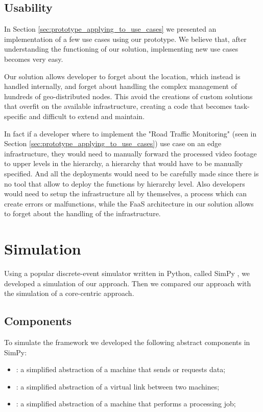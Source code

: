 \subsection{Usability}
In Section \ref{sec:prototype_applying_to_use_cases} we presented an implementation of a few use cases using our prototype. We believe that, after understanding the functioning of our solution, implementing new use cases becomes very easy.

Our solution allows developer to forget about the location, which instead is handled internally, and forget about handling the complex management of hundreds of geo-distributed nodes.
This avoid the creations of custom solutions that overfit on the available infrastructure, creating a code that becomes task-specific and difficult to extend and maintain.

In fact if a developer where to implement the "Road Traffic Monitoring" (seen in Section \ref{sec:prototype_applying_to_use_cases}) use case on an edge infrastructure, they would need to manually forward the processed video footage to upper levels in the hierarchy, a hierarchy that would have to be manually specified. And all the deployments would need to be carefully made since there is no tool that allow to deploy the functions by hierarchy level.
Also developers would need to setup the infrastructure all by themselves, a process which can create errors or malfunctions, while the FaaS architecture in our solution allows to forget about the handling of the infrastructure.


\section{Simulation}
Using a popular discrete-event simulator written in Python, called SimPy \cite{simpy}, we developed a simulation of our approach. Then we compared our approach with the simulation of a core-centric approach.


\subsection{Components}
To simulate the framework we developed the following abstract components in SimPy:
\begin{itemize}
    \item {}: a simplified abstraction of a machine that sends or requests data;
    \item {}: a simplified abstraction of a virtual link between two machines;
    \item {}: a simplified abstraction of a machine that performs a processing job;
\end{itemize}

